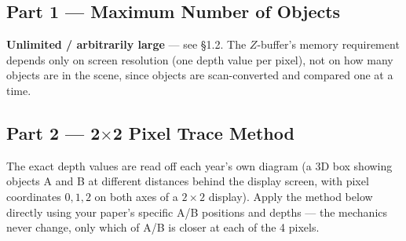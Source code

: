 \documentclass[12pt, a4paper]{article}
\newenvironment{answerbox}{\begin{mdframed}[style=answerframe]}{\end{mdframed}}
\newenvironment{notesbox}{\begin{mdframed}[style=notesframe]}{\end{mdframed}}
\begin{document}
\subsection*{Part 1 --- Maximum Number of Objects}
\begin{answerbox}
\textbf{Unlimited / arbitrarily large} --- see \S1.2. The $Z$-buffer's memory requirement depends only on screen resolution (one depth value per pixel), not on how many objects are in the scene, since objects are scan-converted and compared one at a time.
\end{answerbox}

\subsection*{Part 2 --- 2$\times$2 Pixel Trace Method}
\begin{notesbox}
The exact depth values are read off each year's own diagram (a 3D box showing objects A and B at different distances behind the display screen, with pixel coordinates $0,1,2$ on both axes of a $2\times2$ display). Apply the method below directly using your paper's specific A/B positions and depths --- the mechanics never change, only which of A/B is closer at each of the 4 pixels.
\end{notesbox}
\end{document}
